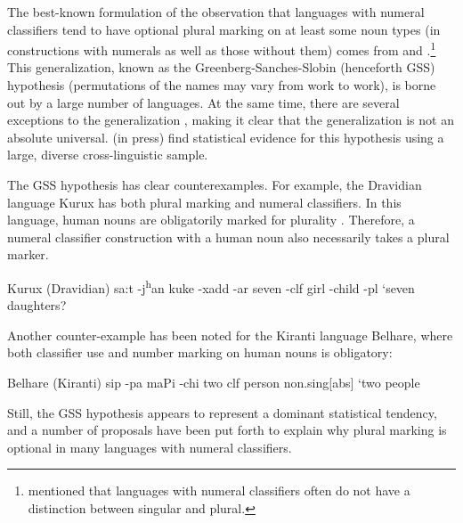 \documentclass[11pt]{article}
\begin{document}
The best-known formulation of the observation that languages with numeral classifiers tend to have optional plural marking on at least some noun types (in constructions with numerals as well as those without them) comes from \citet{Greenberg1972} and \citet{SanchesSlobin1973}.\footnote{%
\citet[190]{Cassirer1923} mentioned that languages with numeral classifiers often do not have a distinction between singular and plural.}
This generalization, known as the Greenberg-Sanches-Slobin (henceforth GSS) hypothesis (permutations of the names may vary from work to work), is borne out by a large number of languages. At the same time, there are several exceptions to the generalization \citep[e.g.,][100--101]{Aikhenvald2000}, making it clear that the generalization is not an absolute universal. 
\citeauthor{TangHerinpress} (in press) find statistical evidence for this hypothesis using a large, diverse cross-linguistic sample. 

The GSS hypothesis has clear counterexamples. %
For example, the Dravidian language Kurux has both plural marking and numeral classifiers. In this language, human nouns are obligatorily marked for plurality \citep[76]{KobayashiTirkey2017}. Therefore, a numeral classifier construction with a human noun also necessarily takes a plural marker. 
\begin{example} Kurux (Dravidian)
\gll sa{\IPA :}t -j\textsuperscript{h}an kuke -xadd -ar
seven -{\sc clf} girl -child -{\sc pl}
\glt `seven daughters? \citep[389, shortened]{KobayashiTirkey2017}
\glend
\end{example}
Another counter-example has been noted for the Kiranti language Belhare, where both classifier use and number marking on human nouns is obligatory:
\begin{example} Belhare (Kiranti)
\gll sip -pa{\ng} ma{\IPA P}i -chi
two {\sc clf} person {\sc non.sing[abs]}
\glt `two people \citep[563]{Bickel2003}
\glend
\end{example}
Still, the GSS hypothesis appears to represent a dominant statistical tendency, and a number of proposals have been put forth to explain why plural marking is optional in many languages with numeral classifiers. 
\end{document}
